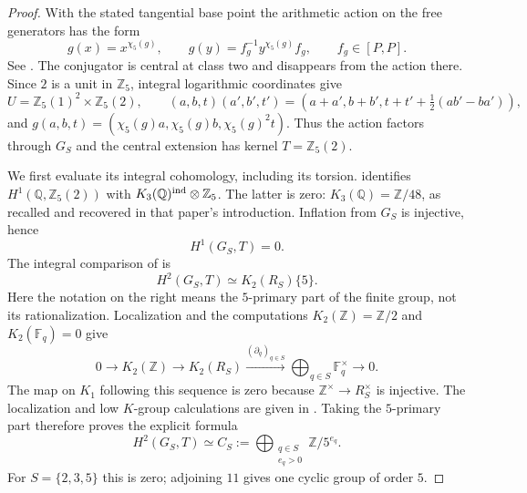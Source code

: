 \begin{proof}
With the stated tangential base point the arithmetic
action on the free generators has the form
\[
 g(x)=x^{\chi_5(g)},\qquad
 g(y)=f_g^{-1}y^{\chi_5(g)}f_g,\qquad f_g\in[P,P].
\]
See \citet[(9), \S3.11]{FA_Wickelgren2012}.
The conjugator is central at class two and disappears
from the action there. Since $2$ is a unit in
$\mathbb Z_5$, integral logarithmic coordinates give
\[
 U=\mathbb Z_5(1)^2\times\mathbb Z_5(2),\qquad
 (a,b,t)(a',b',t')=
 (a+a',b+b',t+t'+\tfrac12(ab'-ba')),
\]
and $g(a,b,t)=(\chi_5(g)a,\chi_5(g)b,\chi_5(g)^2t)$.
Thus the action factors through $G_S$ and the central
extension has kernel $T=\mathbb Z_5(2)$.

We first evaluate its integral cohomology, including
its torsion. \citet[Theorem~4.5]{FA_Levine1989}
identifies $H^1(\mathbb Q,\mathbb Z_5(2))$ with
$K_3(\mathbb Q)^{\rm ind}\otimes\mathbb Z_5$.
The latter is zero: $K_3(\mathbb Q)=\mathbb Z/48$,
as recalled and recovered in that paper's introduction.
Inflation from $G_S$ is injective, hence
\[
                     H^1(G_S,T)=0.
\]
The integral comparison of
\citet[Theorem~5.1]{FA_NguyenQuangDo1986} is
\[
 H^2(G_S,T)\simeq K_2(R_S)\{5\}.
\]
Here the notation on the right means the $5$-primary
part of the finite group, not its rationalization.
Localization and the computations
$K_2(\mathbb Z)=\mathbb Z/2$ and
$K_2(\mathbb F_q)=0$ give
\[
 0\longrightarrow K_2(\mathbb Z)
 \longrightarrow K_2(R_S)
 \xrightarrow{(\partial_q)_{q\in S}}
        \bigoplus_{q\in S}\mathbb F_q^\times
 \longrightarrow0.
\]
The map on $K_1$ following this sequence is zero
because $\mathbb Z^\times\to R_S^\times$ is injective.
The localization and low $K$-group calculations are
given in \citet[III.5.2.2, III.6.1.1 and V.6.6]{FA_Weibel2013}.
Taking the $5$-primary part therefore proves the explicit
formula
\[
        H^2(G_S,T)\simeq
        C_S:=\bigoplus_{\substack{q\in S\\e_q>0}}
                         \mathbb Z/5^{e_q}.
\]
For $S=\{2,3,5\}$ this is zero; adjoining $11$ gives
one cyclic group of order $5$.


\end{proof}
